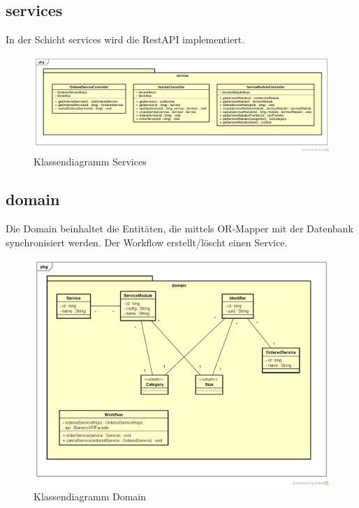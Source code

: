 \subsection{services}

In der Schicht services wird die RestAPI implementiert.

\begin{figure}[!htbp]
\includegraphics[width=\textwidth]{./05_Design/04_Architektur/services}
\caption{Klassendiagramm Services}
\end{figure}

\subsection{domain}

Die Domain beinhaltet die Entitäten, die mittels OR-Mapper mit der Datenbank synchronisiert werden.
Der Workflow erstellt/löscht einen Service.

\begin{figure}[!htbp]
\includegraphics[width=\textwidth]{./05_Design/04_Architektur/domain}
\caption{Klassendiagramm Domain}
\end{figure}
\newpage
